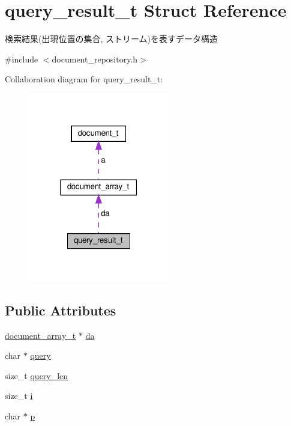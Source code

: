 \hypertarget{structquery__result__t}{}\section{query\+\_\+result\+\_\+t Struct Reference}
\label{structquery__result__t}


検索結果(出現位置の集合, ストリーム)を表すデータ構造  




{\ttfamily \#include $<$document\+\_\+repository.\+h$>$}



Collaboration diagram for query\+\_\+result\+\_\+t\+:\nopagebreak
\begin{figure}[H]
\begin{center}
\leavevmode
\includegraphics[width=175pt]{structquery__result__t__coll__graph}
\end{center}
\end{figure}
\subsection*{Public Attributes}
\begin{DoxyCompactItemize}
\item 
\hyperlink{structdocument__array__t}{document\+\_\+array\+\_\+t} $\ast$ \hyperlink{structquery__result__t_a4b3bddcf5a7c3a3f30ef0ae4c2fe3935}{da}
\item 
char $\ast$ \hyperlink{structquery__result__t_aa5f0530418fd600f6fb0af7ba32028bc}{query}
\item 
size\+\_\+t \hyperlink{structquery__result__t_a2b862804a4bde653fa85acdf84ae0403}{query\+\_\+len}
\item 
size\+\_\+t \hyperlink{structquery__result__t_a73621c1e37c31f8b11ee795c1ffaf808}{i}
\item 
char $\ast$ \hyperlink{structquery__result__t_ad44a1b8a87775c59260626095bb42945}{p}
\end{DoxyCompactItemize}


